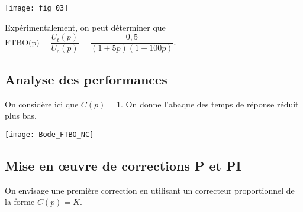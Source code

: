 \begin{multicols}{2}
\begin{center}
\texttt{[image: fig\_03]}
\end{center}
%
%
%
%
%

Expérimentalement, on peut déterminer que $\text{FTBO(p)}=\dfrac{U_t(p)}{U_c(p)}=\dfrac{0,5}{\left(1+5 p \right)\left(1+100 p \right)}$.

\subsection*{Analyse des performances}
On considère ici que $C(p)=1$. On donne l'abaque des temps de réponse réduit plus bas.



\ifprof
\else
\begin{center}
\texttt{[image: Bode\_FTBO\_NC]}
\end{center}
\fi


\subsection*{Mise en \oe{}uvre de corrections P et PI}

On envisage une première correction en utilisant un correcteur proportionnel de la forme $C(p)=K$.



\end{multicols}
